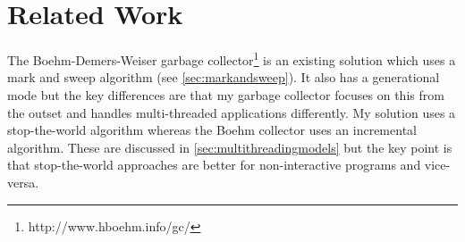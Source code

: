 \documentclass[../diss.tex]{subfiles}
\begin{document}
\section{Related Work} \label{sec:furtherwork}

The Boehm-Demers-Weiser garbage collector\footnote{http://www.hboehm.info/gc/} is an existing solution which uses a mark and sweep algorithm (see \cref{sec:markandsweep}). It also has a generational mode but the key differences are that my garbage collector focuses on this from the outset and handles multi-threaded applications differently. My solution uses a stop-the-world algorithm whereas the Boehm collector uses an incremental algorithm. These are discussed in \cref{sec:multithreadingmodels} but the key point is that stop-the-world approaches are better for non-interactive programs and vice-versa.
\end{document}

